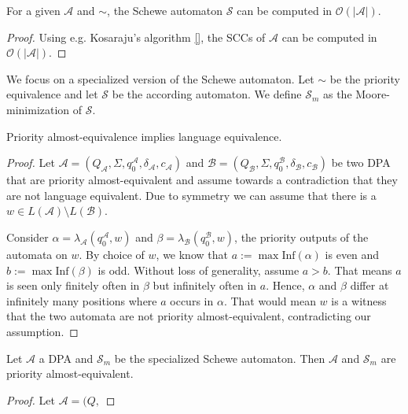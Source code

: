 \begin{lem}
	For a given $\mathcal{A}$ and $\sim$, the Schewe automaton $\mathcal{S}$ can be computed in $\mathcal{O}(|\mathcal{A}|)$.
\end{lem}

\begin{proof}
	Using e.g. Kosaraju's algorithm \ref{}, the SCCs of $\mathcal{A}$ can be computed in $\mathcal{O}(|\mathcal{A}|)$. %
\end{proof}

We focus on a specialized version of the Schewe automaton. Let $\sim$ be the priority equivalence and let $\mathcal{S}$ be the according automaton. We define $\mathcal{S}_m$ as the Moore-minimization of $\mathcal{S}$.

\begin{lem}
	Priority almost-equivalence implies language equivalence.
\end{lem}

\begin{proof}
	Let $\mathcal{A} = (Q_\mathcal{A}, \Sigma, q_0^\mathcal{A}, \delta_\mathcal{A}, c_\mathcal{A})$ and $\mathcal{B} = (Q_\mathcal{B}, \Sigma, q_0^\mathcal{B}, \delta_\mathcal{B}, c_\mathcal{B})$ be two DPA that are priority almost-equivalent and assume towards a contradiction that they are not language equivalent. Due to symmetry we can assume that there is a $w \in L(\mathcal{A}) \setminus L(\mathcal{B})$. 
	
	Consider $\alpha = \lambda_\mathcal{A}(q_0^\mathcal{A}, w)$ and $\beta = \lambda_\mathcal{B}(q_0^\mathcal{B}, w)$, the priority outputs of the automata on $w$. By choice of $w$, we know that $a := \max \text{Inf}(\alpha)$ is even and $b := \max \text{Inf}(\beta)$ is odd. Without loss of generality, assume $a > b$. That means $a$ is seen only finitely often in $\beta$ but infinitely often in $a$. Hence, $\alpha$ and $\beta$ differ at infinitely many positions where $a$ occurs in $\alpha$. That would mean $w$ is a witness that the two automata are not priority almost-equivalent, contradicting our assumption.
\end{proof}

\begin{lem}
	Let $\mathcal{A}$ a DPA and $\mathcal{S}_m$ be the specialized Schewe automaton. Then $\mathcal{A}$ and $\mathcal{S}_m$ are priority almost-equivalent.
\end{lem}

\begin{proof}
	Let $\mathcal{A} = (Q,$
\end{proof}

